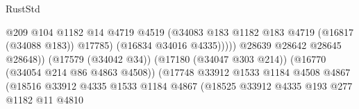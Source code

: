 \begin{lexlean}{RustStd}
\begin{coremodule}
                                                            @209
                                                            @104
                                                            @1182
                                                            @14
                                                            @4719
                                                            @4519
                                                            (@34083
                                                              @183
                                                              @1182
                                                              @183
                                                              @4719
                                                              (@16817 (@34088 @183))
                                                              @17785)
                                                            (@16834 @34016 @4335)))))
                                                    @28639
                                                    @28642
                                                    @28645
                                                    @28648))
                                                (@17579 (@34042 @34))
                                                (@17180 (@34047 @303 @214))
                                                (@16770 (@34054 @214 @86 @4863 @4508))
                                                (@17748
                                                  @33912
                                                  @1533
                                                  @1184
                                                  @4508
                                                  @4867
                                                  (@18516
                                                    @33912
                                                    @4335
                                                    @1533
                                                    @1184
                                                    @4867
                                                    (@18525
                                                      @33912
                                                      @4335
                                                      @193
                                                      @277
                                                      @1182
                                                      @11
                                                      @4810

\end{coremodule}
\end{lexlean}
